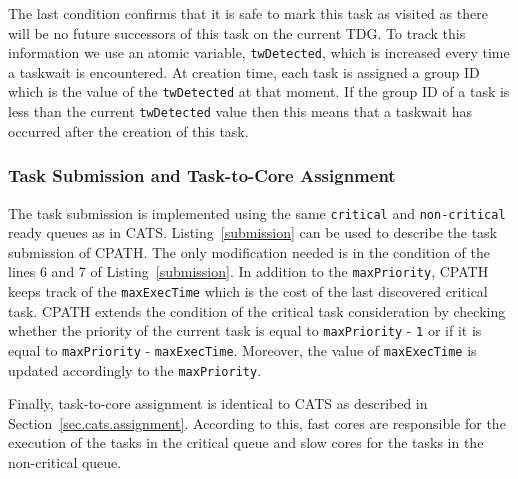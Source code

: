 The last condition confirms that it is safe to mark this task as visited as there will be no future successors of this task on the current TDG. 
To track this information we use an atomic variable, \texttt{twDetected}, which is increased every time a taskwait is encountered.
At creation time, each task is assigned a group ID which is the value of the \texttt{twDetected} at that moment.
If the group ID of a task is less than the current \texttt{twDetected} value then this means that a taskwait has occurred after the creation of this task.

\subsubsection{Task Submission and Task-to-Core Assignment}
The task submission is implemented using the same \texttt{critical} and \texttt{non-critical} ready queues as in CATS.
Listing~\ref{submission} can be used to describe the task submission of CPATH.
The only modification needed is in the condition of the lines 6 and 7 of Listing~\ref{submission}.
In addition to the \texttt{maxPriority}, CPATH keeps track of the \texttt{maxExecTime} which is the cost of the last discovered critical task.
CPATH extends the condition of the critical task consideration by checking whether the priority of the current task is equal to \texttt{maxPriority} - \texttt{1} or if it is equal to \texttt{maxPriority} - \texttt{maxExecTime}.
Moreover, the value of \texttt{maxExecTime} is updated accordingly to the \texttt{maxPriority}.

Finally, task-to-core assignment is identical to CATS as described in Section~\ref{sec.cats.assignment}. 
According to this, fast cores are responsible for the execution of the tasks in the critical queue and slow cores for the tasks in the non-critical queue.




